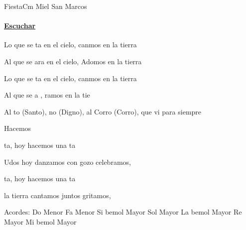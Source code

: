 \documentclass[12pt, spanish]{book}
\begin{document}
    \begin{song}{Fiesta}{Cm}
        {} %
        {Miel San Marcos}
        {} %
        {}
        \ifChordBk
        \paragraph{\mbox{}\hfill\protect\href{https://open.spotify.com/intl-es/track/1gkSSTrGjnwr904VOykCOj}{Escuchar}\mbox{}\hfill}
        \fi


        \begin{SBOpGroup}
            Lo que se ta en el cielo, canmos en la tierra

            Al que se ara en el cielo, Adomos en la tierra

            Lo que se ta en el cielo, canmos en la tierra

            Al que se a   , ramos en la tie
        \end{SBOpGroup}


        \begin{SBOpGroup}
            Al to (Santo), no (Digno), al Corro (Corro), que vi para siempre

            Hacemos
        \end{SBOpGroup}

        \begin{SBChorus}
            ta, hoy hacemos una ta

            Udos hoy danzamos con gozo celebramos,      

            ta, hoy hacemos una ta

             la tierra cantamos juntos gritamos,     
        \end{SBChorus}


        \ifChordBk
        \begin{SBOpGroup}
            Acordes:
            \upchord{\Cm}\qquad Do Menor \hfill
            \upchord{\Fm}\qquad Fa Menor \hfill\null\break
            \upchord{\Bflat}\qquad Si bemol Mayor \hfill
            \upchord{\G}\qquad Sol Mayor \hfill\null\break
            \upchord{\Aflat}\qquad La bemol Mayor \hfill
            \upchord{\D}\qquad Re Mayor \hfill\null\break
            \upchord{\Eflat}\qquad Mi bemol Mayor \hfill
        \end{SBOpGroup}
        \fi
    \end{song}
\end{document}
